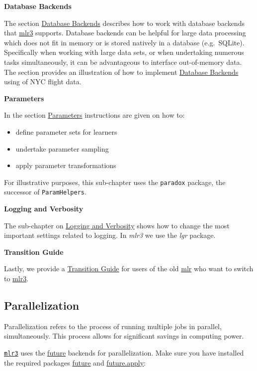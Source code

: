 \documentclass[]{article}
\providecommand{\tightlist}{%
  \setlength{\itemsep}{0pt}\setlength{\parskip}{0pt}}
\begin{document}
\textbf{Database Backends}

The section \protect\hyperlink{backends}{Database Backends} describes how to work with database backends that \href{https://mlr3.mlr-org.com}{mlr3} supports.
Database backends can be helpful for large data processing which does not fit in memory or is stored natively in a database (e.g.~SQLite).
Specifically when working with large data sets, or when undertaking numerous tasks simultaneously, it can be advantageous to interface out-of-memory data.
The section provides an illustration of how to implement \protect\hyperlink{backends}{Database Backends} using of NYC flight data.

\textbf{Parameters}

In the section \protect\hyperlink{paradox}{Parameters} instructions are given on how to:

\begin{itemize}
\tightlist
\item
  define parameter sets for learners
\item
  undertake parameter sampling
\item
  apply parameter transformations
\end{itemize}

For illustrative purposes, this sub-chapter uses the \texttt{paradox} package, the successor of \texttt{ParamHelpers}.

\textbf{Logging and Verbosity}

The sub-chapter on \protect\hyperlink{logging}{Logging and Verbosity} shows how to change the most important settings related to logging.
In \emph{mlr3} we use the \emph{lgr} package.

\textbf{Transition Guide}

Lastly, we provide a \protect\hyperlink{transition}{Transition Guide} for users of the old \href{https://mlr.mlr-org.com}{mlr} who want to switch to \href{https://mlr3.mlr-org.com}{mlr3}.

\hypertarget{parallelization}{%
\subsection{Parallelization}\label{parallelization}}

Parallelization refers to the process of running multiple jobs in parallel, simultaneously.
This process allows for significant savings in computing power.

\href{https://github.com/mlr-org/mlr3}{\texttt{mlr3}} uses the \href{https://cran.r-project.org/package=future}{future} backends for parallelization.
Make sure you have installed the required packages \href{https://cran.r-project.org/package=future}{future} and \href{https://cran.r-project.org/package=future.apply}{future.apply}:
\end{document}
